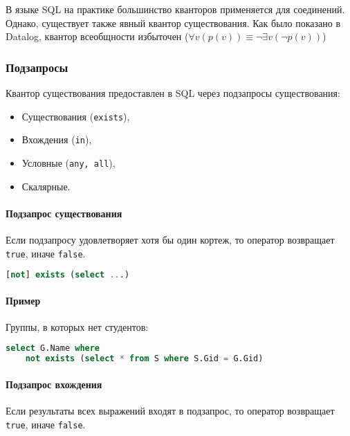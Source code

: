 \begin{remark}
	В языке SQL на практике большинство кванторов применяется для соединений. Однако, существует также
	явный квантор существования. Как было показано в Datalog, квантор всеобщности избыточен
	($\forall v(p(v)) \equiv \neg \exists v(\neg p(v))$)
\end{remark}

\subsubsection{Подзапросы}

Квантор существования предоставлен в SQL через подзапросы существования:

\begin{itemize}
	\item Существования (\texttt{exists}),
	\item Вхождения (\texttt{in}),
	\item Условные (\texttt{any, all}),
	\item Скалярные.
\end{itemize}

\paragraph{Подзапрос существования}

Если подзапросу удовлетворяет хотя бы один кортеж, то оператор возвращает \texttt{true},
иначе \texttt{false}.

\begin{lstlisting}[language=SQL]
    [not] exists (select ...)
\end{lstlisting}

\paragraph{Пример}

Группы, в которых нет студентов:

\begin{lstlisting}[language=SQL]
    select G.Name where
    not exists (select * from S where S.Gid = G.Gid)
\end{lstlisting}

\paragraph{Подзапрос вхождения}

Если результаты всех выражений входят в подзапрос, то оператор возвращает \texttt{true},
иначе \texttt{false}.

